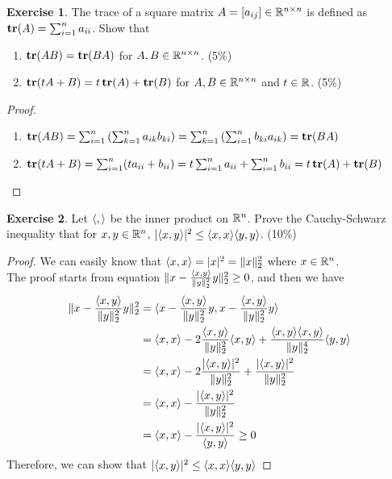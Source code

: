 \documentclass[12pt]{extarticle}
\theoremstyle{definition}
\newtheorem{exercise}{Exercise}
\begin{document}
\begin{exercise}
  The trace of a square matrix $A=[a_{ij}]\in\mathbb{R}^{n\times n}$ is defined as $\mathop{\bf tr}(A)=\sum_{i=1}^n a_{ii}$. Show that
  \begin{enumerate}[label=(\alph*)]
    \item $\mathop{\bf tr}(AB) = \mathop{\bf tr}(BA)$ for $A, B \in \mathbb{R}^{n\times n}$. (5\%)
    \item $\mathop{\bf tr}(tA+B) = t\mathop{\bf tr}(A) + \mathop{\bf tr}(B)$ for $A, B \in \mathbb{R}^{n\times n}$ and $t\in\mathbb{R}$. (5\%)
  \end{enumerate}
\end{exercise}
\begin{proof}
  $ $
  \begin{enumerate}[label=(\alph*)]
    \item $\mathop{\bf tr}(AB) = \sum_{i=1}^n\left(\sum_{k=1}^na_{ik}b_{ki}\right) = \sum_{k=1}^n\left(\sum_{i=1}^nb_{ki}a_{ik}\right) = \mathop{\bf tr}(BA)$
    \item $\mathop{\bf tr}(tA+B) = \sum_{i=1}^n(ta_{ii}+b_{ii}) = t\sum_{i=1}^na_{ii}+\sum_{i=1}^nb_{ii} = t\mathop{\bf tr}(A)+\mathop{\bf tr}(B)$ \qedhere
  \end{enumerate}
\end{proof}

\begin{exercise}
  Let $\langle,\rangle$ be the inner product on $\mathbb{R}^n$. Prove the Cauchy-Schwarz inequality that for $x, y\in\mathbb{R}^n$, $|\langle x,y\rangle|^2\le\langle x,x\rangle\langle y,y\rangle$. (10\%)
\end{exercise}
\begin{proof}
  We can easily know that $\langle x,x\rangle=|x|^2=\|x\|_2^2$ where $x\in\mathbb{R}^n$.\\
  The proof starts from equation $\|x-\frac{\langle x,y\rangle}{\|y\|_2^2}y\|_2^2\ge 0$, and then we have
  \begin{align*}
    \|x-\frac{\langle x,y\rangle}{\|y\|_2^2}y\|_2^2 
      &= \langle x-\frac{\langle x,y\rangle}{\|y\|_2^2}y,x-\frac{\langle x,y\rangle}{\|y\|_2^2}y\rangle\\
      &= \langle x,x\rangle-2\frac{\langle x,y\rangle}{\|y\|_2^2}\langle x,y\rangle+\frac{\langle x,y\rangle\langle x,y\rangle}{\|y\|_2^4}\langle y,y\rangle\\
      &= \langle x,x\rangle-2\frac{|\langle x,y\rangle|^2}{\|y\|_2^2}+\frac{|\langle x,y\rangle|^2}{\|y\|_2^2}\\
      &= \langle x,x\rangle-\frac{|\langle x,y\rangle|^2}{\|y\|_2^2}\\
      &= \langle x,x\rangle-\frac{|\langle x,y\rangle|^2}{\langle y,y\rangle} \ge 0
  \end{align*}
  Therefore, we can show that $|\langle x,y\rangle|^2\le\langle x,x\rangle\langle y,y\rangle$
\end{proof}
\end{document}
